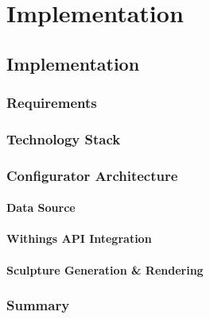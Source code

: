 \chapter{Implementation}
\label{ch:conf}
\section{Implementation}
\subsection{Requirements}
\subsection{Technology Stack}
\subsection{Configurator Architecture}
\subsubsection{Data Source}
\subsubsection{Withings API Integration}
\subsubsection{Sculpture Generation \& Rendering}
\subsection{Summary}
